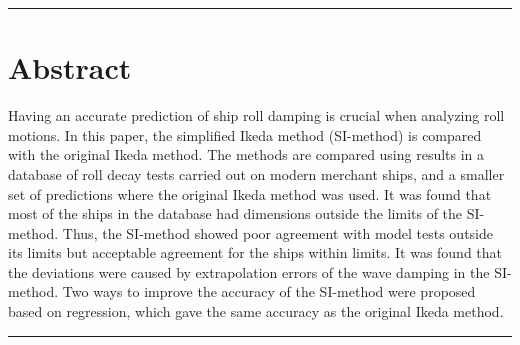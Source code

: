 {\footnotesize
\noindent\rule{\columnwidth}{0.4pt}
\section*{Abstract}\label{se:abstract}
Having an accurate prediction of ship roll damping is crucial when analyzing roll motions. In this paper, the simplified Ikeda method (SI-method) is compared with the original Ikeda method. The methods are compared using results in a database of roll decay tests carried out on modern merchant ships, and a smaller set of predictions where the original Ikeda method was used. It was found that most of the ships in the database had dimensions outside the limits of the SI-method. Thus, the SI-method showed poor agreement with model tests outside its limits but acceptable agreement for the ships within limits. It was found that the deviations were caused by extrapolation errors of the wave damping in the SI-method. Two ways to improve the accuracy of the SI-method were proposed based on regression, which gave the same accuracy as the original Ikeda method. 

}
\newline
\noindent\rule{\columnwidth}{0.4pt}